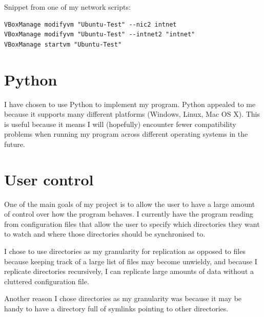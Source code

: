 \documentclass[12pt]{article}
\begin{document}
Snippet from one of my network scripts:
\begin{verbatim}
VBoxManage modifyvm "Ubuntu-Test" --nic2 intnet
VBoxManage modifyvm "Ubuntu-Test" --intnet2 "intnet"
VBoxManage startvm "Ubuntu-Test"
\end{verbatim}

\newpage

\section{Python}
I have chosen to use Python to implement
my program. Python appealed to me because it
supports many different platforms (Windows, Linux, Mac OS X).
This is useful because it means I will (hopefully)
encounter fewer compatibility problems when running
my program across different operating systems in the future.


\section{User control}
One of the main goals of my project is to allow the user
to have a  large amount of control over how the program
behaves. I currently have the program reading from
configuration files that allow the user to specify
which directories they want to watch and where those
directories should be synchronised to.

I chose to use directories as my granularity for replication
as opposed to files because keeping track of a large list
of files may become unwieldy,
and because I replicate
directories recursively, I can replicate large amounts
of data without a cluttered configuration file.

Another reason I chose directories as my granularity was because it may be
handy to have a directory full of symlinks pointing to other directories.
\end{document}
